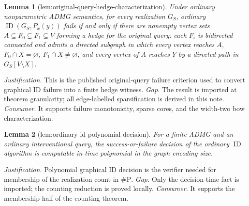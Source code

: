 \documentclass{article}
\newtheorem{lemma}{Lemma}
\begin{document}
\begin{lemma}[lem:original-query-hedge-characterization]\label{lem:original-query-hedge-characterization}
Under ordinary nonparametric ADMG semantics, for every realization \(G_S\), ordinary \(\operatorname{ID}(G_S,P_x(y))\) fails if and only if there are nonempty vertex sets \(A\subseteq F_0\subsetneq F_1\subseteq V\) forming a hedge for the original query: each \(F_i\) is bidirected connected and admits a directed subgraph in which every vertex reaches \(A\), \(F_0\cap X=\varnothing\), \(F_1\cap X\ne\varnothing\), and every vertex of \(A\) reaches \(Y\) by a directed path in \(G_S[V\setminus X]\).
\end{lemma}
\par\smallskip\noindent \textit{Justification.} This is the published original-query failure criterion used to convert graphical ID failure into a finite hedge witness. \textit{Gap.} The result is imported at theorem granularity; all edge-labelled sparsification is derived in this note. \textit{Consumer.} It supports failure monotonicity, sparse cores, and the width-two bow characterization.

\begin{lemma}[lem:ordinary-id-polynomial-decision]\label{lem:ordinary-id-polynomial-decision}
For a finite ADMG and an ordinary interventional query, the success-or-failure decision of the ordinary \(\operatorname{ID}\) algorithm is computable in time polynomial in the graph encoding size.
\end{lemma}
\par\smallskip\noindent \textit{Justification.} Polynomial graphical ID decision is the verifier needed for membership of the realization count in \(\#\mathrm P\). \textit{Gap.} Only the decision-time fact is imported; the counting reduction is proved locally. \textit{Consumer.} It supports the membership half of the counting theorem.
\end{document}
